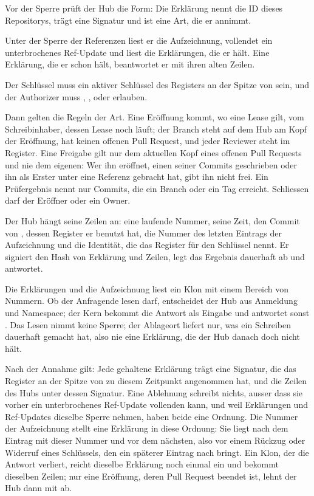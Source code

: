 \startitemize[n]
\item Vor der Sperre prüft der Hub die Form: Die Erklärung nennt die ID dieses Repositorys,
trägt eine Signatur und ist eine Art, die er annimmt.
\item Unter der Sperre der Referenzen liest er die Aufzeichnung, vollendet ein unterbrochenes
Ref-Update und liest die Erklärungen, die er hält.
Eine Erklärung, die er schon hält, beantwortet er mit ihren alten Zeilen.
\item Der Schlüssel muss ein aktiver Schlüssel des Registers an der Spitze von  sein,
und der Authorizer muss , ,  oder 
erlauben.
\item Dann gelten die Regeln der Art.
Eine Eröffnung kommt, wo eine Lease gilt, vom Schreibinhaber, dessen Lease noch läuft;
der Branch steht auf dem Hub am Kopf der Eröffnung, hat keinen offenen Pull Request,
und jeder Reviewer steht im Register.
Eine Freigabe gilt nur dem aktuellen Kopf eines offenen Pull Requests und nie dem eigenen: Wer
ihn eröffnet, einen seiner Commits geschrieben oder ihn als Erster unter eine Referenz gebracht
hat, gibt ihn nicht frei.
Ein Prüfergebnis nennt nur Commits, die ein Branch oder ein Tag erreicht.
Schliessen darf der Eröffner oder ein Owner.
\item Der Hub hängt seine Zeilen an: eine laufende Nummer, seine Zeit, den Commit von
, dessen Register er benutzt hat, die Nummer des letzten Eintrags der Aufzeichnung
und die Identität, die das Register für den Schlüssel nennt.
Er signiert den Hash von Erklärung und Zeilen, legt das Ergebnis dauerhaft ab und antwortet.
\stopitemize

Die Erklärungen und die Aufzeichnung liest ein Klon mit einem Bereich von Nummern.
Ob der Anfragende lesen darf, entscheidet der Hub aus Anmeldung und Namespace; der Kern bekommt
die Antwort als Eingabe und antwortet sonst .
Das Lesen nimmt keine Sperre; der Ablageort liefert nur, was ein Schreiben dauerhaft gemacht
hat, also nie eine Erklärung, die der Hub danach doch nicht hält.

Nach der Annahme gilt: Jede gehaltene Erklärung trägt eine Signatur, die das Register an der
Spitze von  zu diesem Zeitpunkt angenommen hat, und die Zeilen des Hubs unter dessen
Signatur.
Eine Ablehnung schreibt nichts, ausser dass sie vorher ein unterbrochenes Ref-Update
vollenden kann, und weil Erklärungen und Ref-Updates dieselbe Sperre nehmen, haben beide eine
Ordnung.
Die Nummer der Aufzeichnung stellt eine Erklärung in diese Ordnung: Sie liegt nach dem Eintrag
mit dieser Nummer und vor dem nächsten, also vor einem Rückzug oder Widerruf eines Schlüssels,
den ein späterer Eintrag nach  bringt.
Ein Klon, der die Antwort verliert, reicht dieselbe Erklärung noch einmal ein und bekommt
dieselben Zeilen; nur eine Eröffnung, deren Pull Request beendet ist, lehnt der Hub dann mit
 ab.

